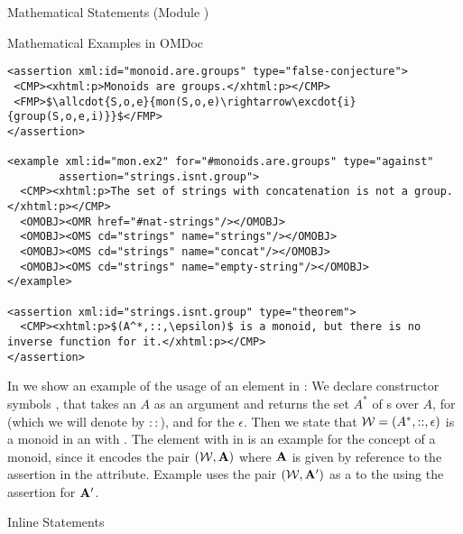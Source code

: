 \begin{tchapter}[id=statements,short=Mathematical Statements]{Mathematical Statements (Module {})}
\begin{tsection}[id=examples]{Mathematical Examples in OMDoc}
\begin{lstlisting}[label=lst:example,mathescape,
  caption={An {\omdoc} representation of a mathematical example},
  index={example,for,type,assertion}]
<assertion xml:id="monoid.are.groups" type="false-conjecture">
 <CMP><xhtml:p>Monoids are groups.</xhtml:p></CMP>
 <FMP>$\allcdot{S,o,e}{mon(S,o,e)\rightarrow\excdot{i}{group(S,o,e,i)}}$</FMP>
</assertion>

<example xml:id="mon.ex2" for="#monoids.are.groups" type="against"
        assertion="strings.isnt.group">
  <CMP><xhtml:p>The set of strings with concatenation is not a group.</xhtml:p></CMP>
  <OMOBJ><OMR href="#nat-strings"/></OMOBJ>
  <OMOBJ><OMS cd="strings" name="strings"/></OMOBJ>
  <OMOBJ><OMS cd="strings" name="concat"/></OMOBJ>
  <OMOBJ><OMS cd="strings" name="empty-string"/></OMOBJ>
</example>

<assertion xml:id="strings.isnt.group" type="theorem">
  <CMP><xhtml:p>$(A^*,::,\epsilon)$ is a monoid, but there is no inverse function for it.</xhtml:p></CMP>
</assertion>
\end{lstlisting}

In {} we show an example of the usage of an {} element
in {\omdoc}: We declare constructor symbols {}, that takes an
{} $A$ as an argument and returns the set $A^*$ of
{s} over $A$, {} for {}
(which we will denote by $::$), and {} for the
{} $\epsilon$.  Then we state that ${\cal W}=(A^*,::,\epsilon)$ is a
monoid in an {} with {}.  The
{} element with {} in {} is
an example for the concept of a monoid, since it encodes the pair $({\cal W},{\bf A})$ where ${\bf A}$
is given by reference to the assertion {} in the
{} attribute.  Example {} uses the pair
$({\cal W},{\bf A}')$ as a {} to the {}
{} using the assertion {} for
${\bf A}'$.
\end{tsection}

\begin{tsection}[id=inline-statements]{Inline Statements}


\end{tsection}
\end{tchapter}

